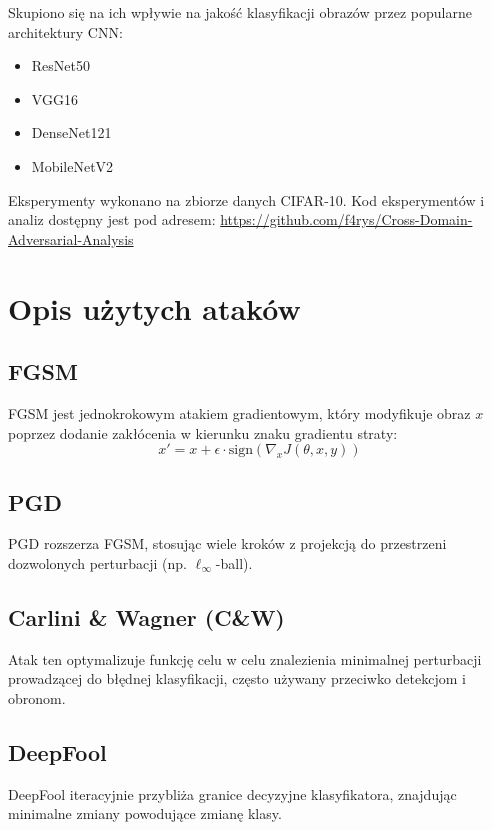 \documentclass[12pt]{article}
\begin{document}
Skupiono się na ich wpływie na jakość klasyfikacji obrazów przez popularne architektury CNN:
\begin{itemize}
    \item ResNet50
    \item VGG16
    \item DenseNet121
    \item MobileNetV2
\end{itemize}

Eksperymenty wykonano na zbiorze danych CIFAR-10. Kod eksperymentów i analiz dostępny jest pod adresem: \url{https://github.com/f4rys/Cross-Domain-Adversarial-Analysis}

\section{Opis użytych ataków}
\subsection{FGSM}
FGSM \cite{goodfellow2014explaining} jest jednokrokowym atakiem gradientowym, który modyfikuje obraz $x$ poprzez dodanie zakłócenia w kierunku znaku gradientu straty:
\begin{equation}
    x' = x + \epsilon \cdot \text{sign}(\nabla_x J(\theta, x, y))
\end{equation}

\subsection{PGD}
PGD \cite{madry2017towards} rozszerza FGSM, stosując wiele kroków z projekcją do przestrzeni dozwolonych perturbacji (np. $\ell_\infty$-ball).

\subsection{Carlini \& Wagner (C\&W)}
Atak ten \cite{carlini2017towards} optymalizuje funkcję celu w celu znalezienia minimalnej perturbacji prowadzącej do błędnej klasyfikacji, często używany przeciwko detekcjom i obronom.

\subsection{DeepFool}
DeepFool \cite{moosavi2016deepfool} iteracyjnie przybliża granice decyzyjne klasyfikatora, znajdując minimalne zmiany powodujące zmianę klasy.
\end{document}
